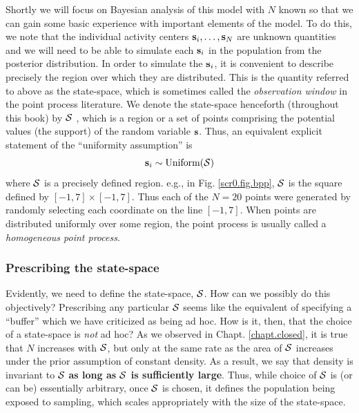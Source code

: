 Shortly we will focus on Bayesian analysis of this model with $N$
known so that we can gain some basic experience with important
elements of the model.  To do this, we note that the individual
activity centers ${\bf s}_{i},\ldots, {\bf s}_{N}$ are unknown
quantities and we will need to be able to simulate each ${\bf s}_{i}$
in the population from the posterior distribution.  In order to
simulate the ${\bf s}_{i}$, it is convenient to describe precisely the
region over which they are distributed. This is the quantity referred
to above as the state-space, which is sometimes called the {\it
  observation window} in the point process literature. We denote the
state-space henceforth (throughout this book) by ${\cal S}$ , which is
a region or a set of points comprising the potential values (the
support) of the random variable ${\bf s}$. Thus, an equivalent
explicit statement of the ``uniformity assumption'' is
\[
{\bf s}_{i} \sim \mbox{Uniform}({\cal S})
\]
where ${\cal S}$ is a precisely defined region. e.g., in Fig.
\ref{scr0.fig.bpp}, ${\cal S}$ is the square defined by $[-1,7] \times
[-1, 7]$. Thus each of the $N=20$ points were generated by randomly
selecting each coordinate on the line $[-1, 7]$. When points are
distributed uniformly
over some region, the point process is usually called a {\it
  homogeneous point process}.



\subsubsection{Prescribing the state-space}
\label{scr0.sec.ss}

Evidently, we need to define the state-space, ${\cal S}$. How can we
possibly do this objectively? Prescribing any particular ${\cal S}$
seems like the equivalent of specifying a ``buffer'' which we
have criticized as being ad hoc. How is it, then, that the
choice of a state-space is {\it not} ad hoc?
As we observed in Chapt. \ref{chapt.closed}, it is true
that $N$ increases with ${\cal S}$, but only at the same rate as the
area of ${\cal S}$ increases under the prior assumption of constant
density. As a result, we say that density is invariant to ${\cal S}$
{\bf as long as ${\cal S}$ is sufficiently large}. Thus, while choice of
${\cal S}$ is (or can be) essentially arbitrary, once ${\cal S}$ is
chosen, it defines the population being exposed to sampling, which
scales appropriately with the size of the state-space.


